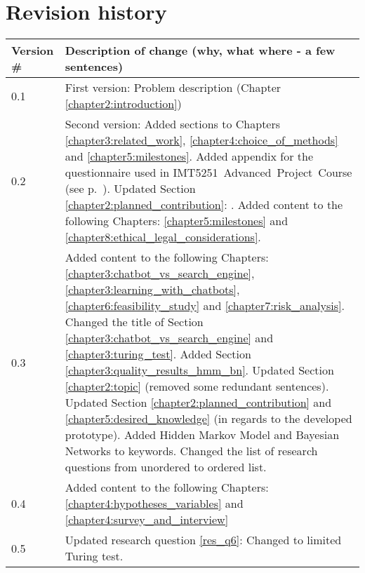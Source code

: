 \chapter*{Revision history}

\begin{center}
	\begin{tabular}[H]{|l|p{35em}|}
		\hline
		Version \#  & Description of change (why, what where - a few sentences)\\
		\hline
		0.1   & First version: Problem description (Chapter \ref{chapter2:introduction})\\
		\hline
		0.2   & Second version: Added sections to Chapters \ref{chapter3:related_work}, \ref{chapter4:choice_of_methods} and \ref{chapter5:milestones}. 
		\newline  
		Added appendix for the questionnaire used in \newline IMT5251~Advanced~Project~Course (see p.~\pageref{appendix:questionnaire}).
		\newline  
		Updated Section \ref{chapter2:planned_contribution}: \nameref{chapter2:planned_contribution}.
		\newline  
		Added content to the following Chapters: \ref{chapter5:milestones} and \ref{chapter8:ethical_legal_considerations}. \\
		\hline
		0.3   & Added content to the following Chapters: \ref{chapter3:chatbot_vs_search_engine}, \ref{chapter3:learning_with_chatbots}, 
		\ref{chapter6:feasibility_study} and \ref{chapter7:risk_analysis}. \newline
		Changed the title of Section \ref{chapter3:chatbot_vs_search_engine} and \ref{chapter3:turing_test}. 
		Added Section \ref{chapter3:quality_results_hmm_bn}. \newline
		Updated Section \ref{chapter2:topic} (removed some redundant sentences). \newline
		Updated Section \ref{chapter2:planned_contribution} and \ref{chapter5:desired_knowledge} (in regards to the developed prototype). \newline
		Added Hidden Markov Model and Bayesian Networks to keywords. \newline
		Changed the list of research questions from unordered to ordered list.	\\
		\hline
		0.4   & Added content to the following Chapters: \ref{chapter4:hypotheses_variables} and \ref{chapter4:survey_and_interview} \\
		\hline
		0.5   & Updated research question \ref{res_q6}: Changed to limited Turing test.\newline

\end{tabular}
\end{center}
